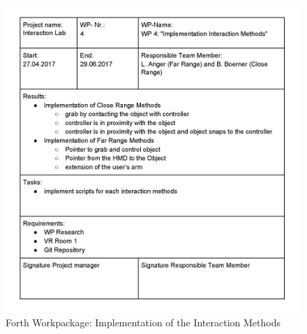 \newpage
\begin{figure}[H] 
	\center 
	\includegraphics[width= 16 cm]{Images/Workpackages_Seite_4.jpg}			
	\caption[]{Forth Workpackage: Implementation of the  Interaction Methods}
	\label{fig:Workpackage4}
\end{figure} 

